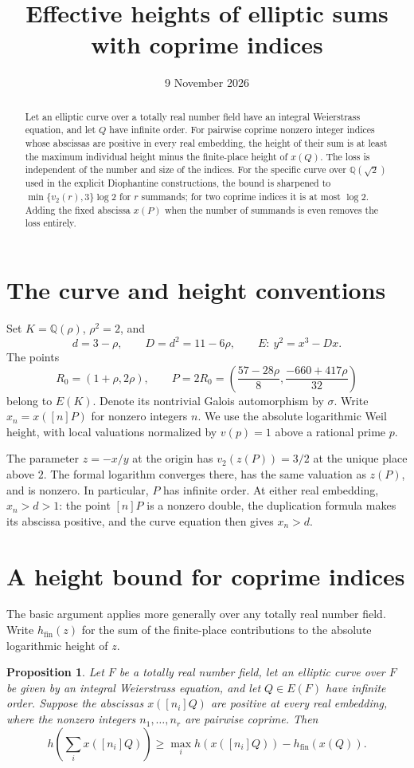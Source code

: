\documentclass[11pt]{article}
\title{Effective heights of elliptic sums with coprime indices}
\author{}\date{9 November 2026}
\newtheorem{proposition}[theorem]{Proposition}
\theoremstyle{remark}\newtheorem{remark}[theorem]{Remark}
\newcommand{\Q}{\mathbb Q}\newcommand{\Z}{\mathbb Z}
\begin{document}
\maketitle
\begin{abstract}
Let an elliptic curve over a totally real number field have an integral
Weierstrass equation, and let $Q$ have infinite order.  For pairwise
coprime nonzero integer indices whose abscissas are positive in every
real embedding, the height of their sum is at least the maximum
individual height minus the finite-place height of $x(Q)$.  The loss is
independent of the number and size of the indices.  For the specific
curve over $\Q(\sqrt2)$ used in the explicit Diophantine constructions,
the bound is sharpened to $\min\{v_2(r),3\}\log2$ for $r$ summands;
for two coprime indices it is at most $\log2$.
Adding the fixed abscissa $x(P)$ when the number of summands is even
removes the loss entirely.
\end{abstract}

\section{The curve and height conventions}
Set $K=\Q(\rho)$, $\rho^2=2$, and
\[
d=3-\rho,\qquad D=d^2=11-6\rho,\qquad
E:\ y^2=x^3-Dx.
\]
The points
\[
R_0=(1+\rho,2\rho),\qquad
P=2R_0=\left(\frac{57-28\rho}{8},
                 \frac{-660+417\rho}{32}\right)
\]
belong to $E(K)$.  Denote its nontrivial Galois automorphism by
$\sigma$.  Write $x_n=x([n]P)$ for nonzero integers $n$.
We use the absolute logarithmic Weil height, with local valuations
normalized by $v(p)=1$ above a rational prime $p$.

The parameter $z=-x/y$ at the origin has
$v_2(z(P))=3/2$ at the unique place above $2$.
The formal logarithm converges there, has the same valuation as $z(P)$,
and is nonzero.  In particular, $P$ has infinite order.
At either real embedding, $x_n>d>1$: the point $[n]P$ is a nonzero
double, the duplication formula makes its abscissa positive, and the
curve equation then gives $x_n>d$.

\section{A height bound for coprime indices}
The basic argument applies more generally over any totally real number
field.  Write $h_{\mathrm{fin}}(z)$ for the sum of the finite-place
contributions to the absolute logarithmic height of $z$.

\begin{proposition}\label{prop:general}
Let $F$ be a totally real number field, let an elliptic curve over $F$
be given by an integral Weierstrass equation, and let $Q\in E(F)$ have
infinite order.  Suppose the abscissas $x([n_i]Q)$ are positive at every
real embedding, where the nonzero integers $n_1,\ldots,n_r$ are
pairwise coprime.  Then
\[
h\left(\sum_i x([n_i]Q)\right)
 \ge\max_i h(x([n_i]Q))-h_{\mathrm{fin}}(x(Q)).
\]
\end{proposition}
\end{document}
